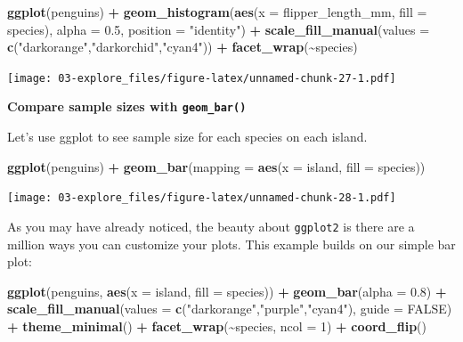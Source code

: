 \documentclass[
]{book}
\newenvironment{Shaded}{\begin{snugshade}}{\end{snugshade}}
\newcommand{\AttributeTok}[1]{\textcolor[rgb]{0.13,0.29,0.53}{#1}}
\newcommand{\ConstantTok}[1]{\textcolor[rgb]{0.56,0.35,0.01}{#1}}
\newcommand{\DecValTok}[1]{\textcolor[rgb]{0.00,0.00,0.81}{#1}}
\newcommand{\FloatTok}[1]{\textcolor[rgb]{0.00,0.00,0.81}{#1}}
\newcommand{\FunctionTok}[1]{\textcolor[rgb]{0.13,0.29,0.53}{\textbf{#1}}}
\newcommand{\NormalTok}[1]{#1}
\newcommand{\SpecialCharTok}[1]{\textcolor[rgb]{0.81,0.36,0.00}{\textbf{#1}}}
\newcommand{\StringTok}[1]{\textcolor[rgb]{0.31,0.60,0.02}{#1}}
\begin{document}
\begin{Shaded}
\begin{Highlighting}[]
\FunctionTok{ggplot}\NormalTok{(penguins) }\SpecialCharTok{+}
  \FunctionTok{geom\_histogram}\NormalTok{(}\FunctionTok{aes}\NormalTok{(}\AttributeTok{x =}\NormalTok{ flipper\_length\_mm, }\AttributeTok{fill =}\NormalTok{ species), }\AttributeTok{alpha =} \FloatTok{0.5}\NormalTok{, }\AttributeTok{position =} \StringTok{"identity"}\NormalTok{) }\SpecialCharTok{+}
  \FunctionTok{scale\_fill\_manual}\NormalTok{(}\AttributeTok{values =} \FunctionTok{c}\NormalTok{(}\StringTok{"darkorange"}\NormalTok{,}\StringTok{"darkorchid"}\NormalTok{,}\StringTok{"cyan4"}\NormalTok{)) }\SpecialCharTok{+}
  \FunctionTok{facet\_wrap}\NormalTok{(}\SpecialCharTok{\textasciitilde{}}\NormalTok{species)}
\end{Highlighting}
\end{Shaded}

\texttt{[image: 03-explore\_files/figure-latex/unnamed-chunk-27-1.pdf]}

\textbf{Compare sample sizes with \texttt{geom\_bar()}}

Let's use ggplot to see sample size for each species on each island.

\begin{Shaded}
\begin{Highlighting}[]
\FunctionTok{ggplot}\NormalTok{(penguins) }\SpecialCharTok{+}
  \FunctionTok{geom\_bar}\NormalTok{(}\AttributeTok{mapping =} \FunctionTok{aes}\NormalTok{(}\AttributeTok{x =}\NormalTok{ island, }\AttributeTok{fill =}\NormalTok{ species))}
\end{Highlighting}
\end{Shaded}

\texttt{[image: 03-explore\_files/figure-latex/unnamed-chunk-28-1.pdf]}

As you may have already noticed, the beauty about \texttt{ggplot2} is there are a million ways you can customize your plots. This example builds on our simple bar plot:

\begin{Shaded}
\begin{Highlighting}[]
\FunctionTok{ggplot}\NormalTok{(penguins, }\FunctionTok{aes}\NormalTok{(}\AttributeTok{x =}\NormalTok{ island, }\AttributeTok{fill =}\NormalTok{ species)) }\SpecialCharTok{+}
  \FunctionTok{geom\_bar}\NormalTok{(}\AttributeTok{alpha =} \FloatTok{0.8}\NormalTok{) }\SpecialCharTok{+}
  \FunctionTok{scale\_fill\_manual}\NormalTok{(}\AttributeTok{values =} \FunctionTok{c}\NormalTok{(}\StringTok{"darkorange"}\NormalTok{,}\StringTok{"purple"}\NormalTok{,}\StringTok{"cyan4"}\NormalTok{), }
                    \AttributeTok{guide =} \ConstantTok{FALSE}\NormalTok{) }\SpecialCharTok{+}
  \FunctionTok{theme\_minimal}\NormalTok{() }\SpecialCharTok{+}
  \FunctionTok{facet\_wrap}\NormalTok{(}\SpecialCharTok{\textasciitilde{}}\NormalTok{species, }\AttributeTok{ncol =} \DecValTok{1}\NormalTok{) }\SpecialCharTok{+}
  \FunctionTok{coord\_flip}\NormalTok{()}
\end{Highlighting}
\end{Shaded}
\end{document}
